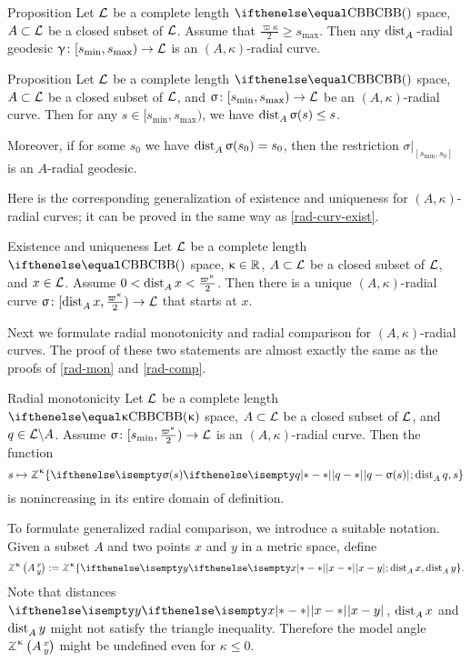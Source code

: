 \begin{thm}{Proposition}
Let $\mathcal{L}$ be a complete length $\Alex{}$ space,
$A\subset\spc{L}$ be a closed subset of $\mathcal{L}$.
Assume that 
$\tfrac{\varpi\kappa}{2}
\ge 
s_{\max}$.
Then any $\mathop{\rm dist}\nolimits_{A}^{{}}{}{}$-radial geodesic 
$\gamma\:[s_{\min},s_{\max})
\to 
\spc{L}$ 
is an $(A,\kappa)$-radial curve.
\end{thm}

\begin{thm}{Proposition}
Let $\mathcal{L}$ be a complete length $\Alex{}$ space,
$A\subset\spc{L}$ be a closed subset of $\mathcal{L}$,
and $\sigma\:[s_{\min},s_{\max})\to \spc{L}$ be an $(A,\kappa)$-radial curve.
Then for any $s\in [s_{\min},s_{\max})$, 
we have $\distfun{A}{\sigma(s)}{}\le s$.

Moreover, if for some $s_0$ we have $\mathop{\rm dist}\nolimits_{A}^{{}}{\upsigma(s_0)}{}= s_0$, 
then the restriction $\sigma|_{[s_{\min},s_0]}$ is an $A$-radial geodesic.
\end{thm}

Here is the corresponding generalization of existence and uniqueness 
for $(A,\kappa)$-radial curves;
it can be proved in the same way as \ref{rad-curv-exist}.

\begin{thm}{Existence and uniqueness}
Let $\mathcal{L}$ be a complete length $\Alex{}$ space, 
$\kappa\in\RR$, 
$A\subset\spc{L}$ be a closed subset of $\mathcal{L}$, 
and $x\in \spc{L}$.
Assume
$0
<
\distfun{A}{x}{}
\z<
\tfrac{\varpi\kappa}2$.
Then there is a unique $(A,\kappa)$-radial curve $\sigma\:[\distfun{A}{x}{},\tfrac{\varpi\kappa}2)\to \spc{L}$ 
that starts at $x$.
\end{thm}

Next we formulate radial monotonicity and radial comparison for $(A,\kappa)$-radial curves.
The proof of these two statements are almost exactly the same as the proofs of \ref{rad-mon} and \ref{rad-comp}.

\begin{thm}{Radial monotonicity}\label{gen-rad-mon}
Let $\mathcal{L}$ be a complete length $\Alex{\kappa}$ space,
$A\subset \spc{L}$ be a closed subset of $\mathcal{L}$,
and $q\in\spc{L}\backslash A$.
Assume $\sigma\:  [s_{\min},\tfrac{\varpi\kappa}2)\to \spc{L}$
is an $(A,\kappa)$-radial curve.
Then the function 
\[s\mapsto 
\tangle\mc\kappa\{
\dist{q}{\sigma(s)}{};
\distfun{A}{q}{},
s
\}\]
is nonincreasing in its entire domain of definition.
\end{thm}

To formulate generalized radial comparison,
we  introduce a suitable notation.
Given a subset $A$ and two points $x$ and $y$ in a metric space, define
\[
\angkk\kappa A{x}{y}
\df
\tangle\mc\kappa\{
\dist{x}{y}{};
\distfun{A}{x}{},
\distfun{A}{y}{}
\}.
\]
Note that distances $\dist{x}{y}{}$, 
$\mathop{\rm dist}\nolimits_{A}^{{}}{x}{}$ and 
$\mathop{\rm dist}\nolimits_{A}^{{}}{y}{}$ might not satisfy the triangle inequality.
Therefore the model angle 
$\angkk\kappa A{x}{y}$ might be undefined even for $\kappa\le0$.

